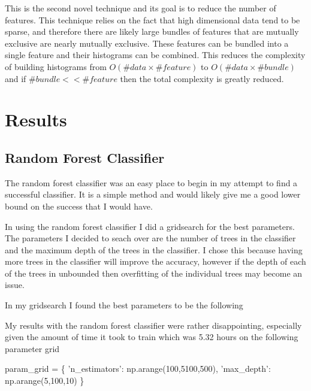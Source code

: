 \documentclass[11pt]{article}
\newenvironment{Shaded}{}{}
\newcommand{\DecValTok}[1]{\textcolor[rgb]{0.25,0.63,0.44}{{#1}}}
\newcommand{\StringTok}[1]{\textcolor[rgb]{0.25,0.44,0.63}{{#1}}}
\newcommand{\NormalTok}[1]{{#1}}
\newcommand{\OperatorTok}[1]{\textcolor[rgb]{0.40,0.40,0.40}{{#1}}}
\begin{document}
This is the second novel technique and its goal is to reduce the number
of features. This technique relies on the fact that high dimensional
data tend to be sparse, and therefore there are likely large bundles of
features that are mutually exclusive are nearly mutually exclusive.
These features can be bundled into a single feature and their histograms
can be combined. This reduces the complexity of building histograms from
\(O(\#data \times \#feature)\) to \(O(\#data \times \#bundle)\) and if
\(\#bundle << \#feature\) then the total complexity is greatly reduced.

    \hypertarget{results}{%
\section{Results}\label{results}}

\hypertarget{random-forest-classifier}{%
\subsection{Random Forest Classifier}\label{random-forest-classifier}}

The random forest classifier was an easy place to begin in my attempt to
find a successful classifier. It is a simple method and would likely
give me a good lower bound on the success that I would have.

In using the random forest classifier I did a gridsearch for the best
parameters. The parameters I decided to seach over are the number of
trees in the classifier and the maximum depth of the trees in the
classifier. I chose this because having more trees in the classifier
will improve the accuracy, however if the depth of each of the trees in
unbounded then overfitting of the individual trees may become an issue.

In my gridsearch I found the best parameters to be the following

    My results with the random forest classifier were rather disappointing,
especially given the amount of time it took to train which was 5.32
hours on the following parameter grid

\begin{Shaded}
\begin{Highlighting}[]
\NormalTok{param_grid }\OperatorTok{=}\NormalTok{ \{}
    \StringTok{'n_estimators'}\NormalTok{: np.arange(}\DecValTok{100}\NormalTok{,}\DecValTok{5100}\NormalTok{,}\DecValTok{500}\NormalTok{),}
    \StringTok{'max_depth'}\NormalTok{: np.arange(}\DecValTok{5}\NormalTok{,}\DecValTok{100}\NormalTok{,}\DecValTok{10}\NormalTok{)}
\NormalTok{\}}
\end{Highlighting}
\end{Shaded}
\end{document}
